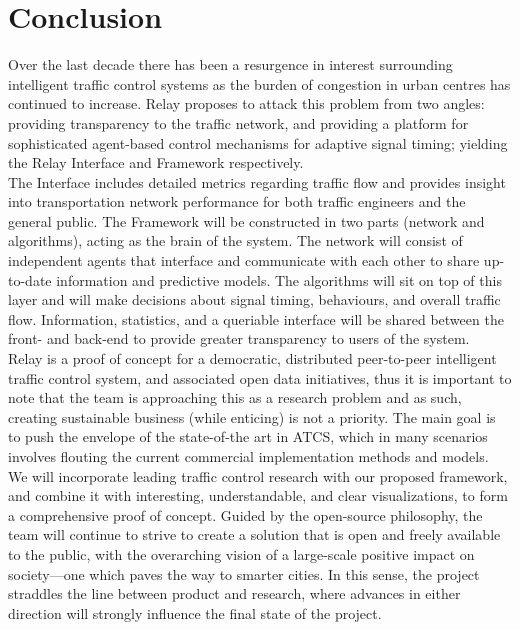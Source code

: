 \documentclass{article}
\begin{document}
\newpage
\section{Conclusion}

Over the last decade there has been a resurgence in interest surrounding intelligent traffic control systems as the burden of congestion in urban centres has continued to increase.
Relay proposes to attack this problem from two angles: providing transparency to the traffic network, and providing a platform for sophisticated agent-based control mechanisms for adaptive signal timing; yielding the Relay Interface and Framework respectively.\\

The Interface includes detailed metrics regarding traffic flow and provides insight into transportation network performance for both traffic engineers and the general public.
The Framework will be constructed in two parts (network and algorithms), acting as the brain of the system.
The network will consist of independent agents that interface and communicate with each other to share up-to-date information and predictive models.
The algorithms will sit on top of this layer and will make decisions about signal timing, behaviours, and overall traffic flow.
Information, statistics, and a queriable interface will be shared between the front- and back-end to provide greater transparency to users of the system.\\

Relay is a proof of concept for a democratic, distributed peer-to-peer intelligent traffic control system, and associated open data initiatives, thus it is important to note that the team is approaching this as a research problem and as such, creating sustainable business (while enticing) is not a priority.
The main goal is to push the envelope of the state-of-the art in ATCS, which in many scenarios involves flouting the current commercial implementation methods and models.
 We will incorporate leading traffic control research with our proposed framework, and combine it with interesting, understandable, and clear visualizations, to form a comprehensive proof of concept.
 Guided by the open-source philosophy, the team will continue to strive to create a solution that is open and freely available to the public, with the overarching vision of a large-scale positive impact on society---one which paves the way to smarter cities.
 In this sense, the project straddles the line between product and research, where advances in either direction will strongly influence the final state of the project.\\
\end{document}
